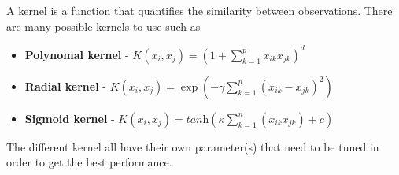\documentclass[aspectratio=169,10pt]{beamer}
\begin{document}
\begin{frame}{\secname}{\subsecname}
  A kernel is a function that quantifies the similarity between observations.
  There are many possible kernels to use such as
  \begin{itemize}
    \item \textbf{Polynomal kernel} - $K(x_i, x_j) = \left(1 + \sum_{k=1}^p x_{ik}x_{jk}\right)^d$
    \item \textbf{Radial kernel} - $K(x_i, x_j) = \exp \left(- \gamma \sum_{k=1}^p (x_{ik} - x_{jk})^2\right)$
    \item \textbf{Sigmoid kernel} - $K(x_i, x_j) = \textit{tanh}\left(\kappa \sum_{k=1}^n (x_{ik} x_{jk}) + c\right)$
  \end{itemize}
  The different kernel all have their own parameter(s) that need to be tuned in order to get the best performance.
\end{frame}
\end{document}
